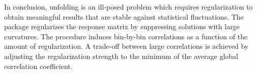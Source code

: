 
In conclusion, unfolding is an ill-posed problem which requires regularization to obtain meaningful results that are stable against statistical fluctuations. The \TUNFOLD package regularizes the response matrix by suppressing solutions with large curvatures. The procedure induces bin-by-bin correlations as a function of the amount of regularization. A trade-off between large correlations is achieved by adjusting the regularization strength to the minimum of the average global correlation coefficient.


